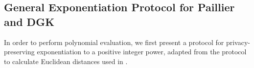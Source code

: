 

\subsection{General Exponentiation Protocol for Paillier and DGK}
\label{ssec:exponentiationprotocol}
In order to perform polynomial evaluation, we first present a protocol for privacy-preserving exponentiation to a positive integer power, adapted from the protocol to calculate Euclidean distances used in \cite{hutchison_privacy-preserving_2009}.

